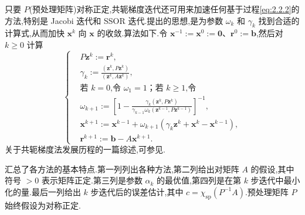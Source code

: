 只要 \(P\)(预处理矩阵)对称正定,共轭梯度迭代还可用来加速任何基于过程\eqref{eq:2.2.2}的方法,特别是 Jacobi 迭代和 SSOR 迭代.提出的思想,是为参数 \(\omega_k\) 和 \(\gamma_k\) 找到合适的计算式,从而加快 \(\boldsymbol{x}^k\) 向 \(\boldsymbol{x}\) 的收敛.算法如下.令 \(\boldsymbol{x}^{-1}:=\boldsymbol{x}^0:=\boldsymbol{0}\)、\(\boldsymbol{r}^0:=\boldsymbol{b}\),然后对 \(k\ge0\) 计算
\begin{equation}\label{eq:2.4.44}
  \left\{
  \begin{aligned}
    &P\boldsymbol{z}^k:=\boldsymbol{r}^k,\\
    &\gamma_k:=\frac{(\boldsymbol{z}^k,P\boldsymbol{z}^k)}{(\boldsymbol{z}^k,A\boldsymbol{z}^k)},\\
    &\text{若 \(k=0\),令 \(\omega_1=1\)；若 \(k\ge1\),令}\\
    &\omega_{k+1}:=\left[1-\frac{\gamma_k(\boldsymbol{z}^k,P\boldsymbol{z}^k)}
         {\gamma_{k-1}\omega_k(\boldsymbol{z}^{k-1},P\boldsymbol{z}^{k-1})}\right]^{-1},\\
    &\boldsymbol{x}^{k+1}:=\boldsymbol{x}^{k-1}+
      \omega_{k+1}(\gamma_k\boldsymbol{z}^k+\boldsymbol{x}^k-\boldsymbol{x}^{k-1}),\\
    &\boldsymbol{r}^{k+1}:=\boldsymbol{b}-A\boldsymbol{x}^{k+1}.
  \end{aligned}
  \right.
\end{equation}
关于共轭梯度法发展历程的一篇综述,可参见.

汇总了各方法的基本特点.第一列列出各种方法,第二列给出对矩阵 \(A\) 的假设,其中符号 \(>0\) 表示矩阵正定.第三列是参数 \(\alpha_k\) 的最优值,第四列是在第 \(k\) 步迭代中最小化的量.最后一列给出 \(k\) 步迭代后的误差估计,其中 \(c=\chi_{\mathrm{sp}}(P^{-1}A)\).预处理矩阵 \(P\) 始终假设为对称正定.

